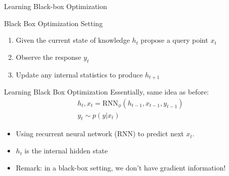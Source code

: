 \begin{frame}[c]{Learning Black-box Optimization~}

\begin{block}{Black Box Optimization Setting}
\begin{enumerate}
\item Given the current state of knowledge $h_t$ propose a query point $x_t$
\item Observe the response $y_t$
\item Update any internal statistics to produce $h_{t+1}$
\end{enumerate}
\end{block}

\pause

\begin{block}{Learning Black Box Optimization}
Essentially, same idea as before:
\begin{eqnarray}
h_t, x_t = \text{RNN}_\phi(h_{t-1}, x_{t-1}, y_{t-1}) \nonumber \\
y_t \sim p(y|x_t)\nonumber
\end{eqnarray}

\begin{itemize}
\item Using recurrent neural network (RNN) to predict next $x_t$.
\item $h_t$ is the internal hidden state 
\pause
\item \alert{Remark:} in a black-box setting, we don't have gradient information!
\end{itemize}

\end{block}



\end{frame}
